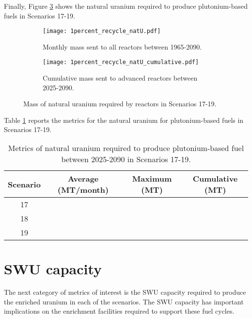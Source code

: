 Finally, Figure \ref{fig:1percent_recycle_natU} shows the natural uranium 
required to produce plutonium-based fuels in Scenarios 17-19. 

\begin{figure}[h!]
    \centering
    \begin{subfigure}[b]{0.45\textwidth}
        \centering
        \texttt{[image: 1percent\_recycle\_natU.pdf]}
        \caption{Monthly mass sent to all reactors 
        between 1965-2090.}
        \label{fig:1percent_recycle_AR_natu}
    \end{subfigure}
    \hfill
    \begin{subfigure}[b]{0.45\textwidth}
        \centering
        \texttt{[image: 1percent\_recycle\_natU\_cumulative.pdf]}
        \caption{Cumulative mass  sent to 
        advanced reactors between 2025-2090.}
        \label{fig:1percent_recycle_natu_cumulative}
    \end{subfigure}
       \caption{Mass of natural uranium required by reactors
        in Scenarios 17-19.}
       \label{fig:1percent_recycle_natU}
\end{figure}

Table \ref{tab:s17-19_natU} reports the metrics for the 
natural uranium for plutonium-based fuels in Scenarios 17-19. 

\begin{table}[h!]
    \centering 
    \caption{Metrics of natural uranium required to produce 
    plutonium-based fuel between 2025-2090 in Scenarios 
    17-19.}
    \label{tab:s17-19_natU}
    \begin{tabular}{c c c c}
        \hline 
        Scenario & Average (MT/month) & Maximum (MT) & Cumulative (MT) \\
        \hline
        17 &  &  & \\
        18 &  &  & \\
        19 &  &  & \\
        \hline
    \end{tabular}
\end{table}


\section{SWU capacity}
The next category of metrics of interest is the \gls{SWU} capacity required 
to produce the enriched uranium in each of the scenarios. The \gls{SWU} 
capacity has important implications on the enrichment facilities required 
to support these fuel cycles. 

